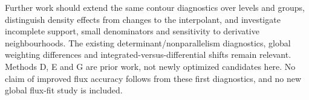 \documentclass[11pt,a4paper]{article}
\begin{document}
Further work should extend the same contour diagnostics over levels and groups, distinguish density effects from changes to the interpolant, and investigate incomplete support, small denominators and sensitivity to derivative neighbourhoods. The existing determinant/nonparallelism diagnostics, global weighting differences and integrated-versus-differential shifts remain relevant. Methods D, E and G are prior work, not newly optimized candidates here. No claim of improved flux accuracy follows from these first diagnostics, and no new global flux-fit study is included.
\end{document}
